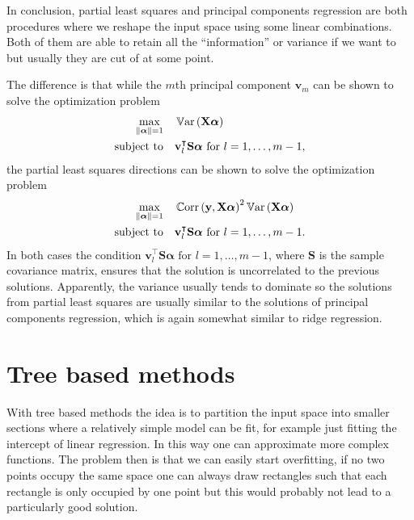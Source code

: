 \documentclass[a4paper, 12pt]{scrartcl}
\newcommand{\bfalpha}{\boldsymbol{\alpha}}
\newcommand{\var}{\operatorname{\mathbb{V}ar}}
\newcommand{\cor}{\operatorname{\mathbb{C}orr}}
\begin{document}
In conclusion, partial least squares and principal components regression are both procedures where we reshape the input space using some linear combinations.
Both of them are able to retain all the ``information'' or variance if we want to but usually they are cut of at some point.

The difference is that while the $m$th principal component $\mathbf{v}_m$ can be shown to solve the optimization problem
\begin{equation*}
	\begin{aligned}
	\operatornamewithlimits{max}_{\left\|\bfalpha\right\|=1} & & &\var\left(\mathbf{X}\bfalpha\right)\\
	\text{subject to} & & & \mathbf{v}_l^\intercal\mathbf{S}\bfalpha\text{ for }l=1,\dots,m-1,
	\end{aligned}
\end{equation*}
the partial least squares directions can be shown to solve the optimization problem
\begin{equation*}
	\begin{aligned}
	\operatornamewithlimits{max}_{\left\|\bfalpha\right\|=1} & & &\cor\left(\mathbf{y},\mathbf{X}\bfalpha\right)^2\var\left(\mathbf{X}\bfalpha\right)\\
	\text{subject to} & & & \mathbf{v}_l^\intercal\mathbf{S}\bfalpha\text{ for }l=1,\dots,m-1.
\end{aligned}
\end{equation*}
In both cases the condition $\mathbf{v}_l^\intercal\mathbf{S}\bfalpha\text{ for }l=1,\dots,m-1$, where $\mathbf{S}$ is the sample covariance matrix, ensures that the solution is uncorrelated to the previous solutions.
Apparently, the variance usually tends to dominate so the solutions from partial least squares are usually similar to the solutions of principal components regression, which is again somewhat similar to ridge regression.

\section{Tree based methods}
With tree based methods the idea is to partition the input space into smaller sections where a relatively simple model can be fit, for example just fitting the intercept of linear regression.
In this way one can approximate more complex functions.
The problem then is that we can easily start overfitting, if no two points occupy the same space one can always draw rectangles such that each rectangle is only occupied by one point but this would probably not lead to a particularly good solution.
\end{document}
